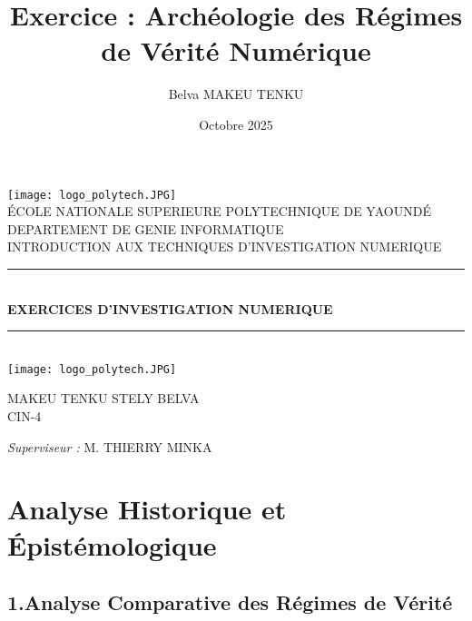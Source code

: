 \documentclass[a4paper,12pt]{report}
\title{Exercice : Archéologie des Régimes de Vérité Numérique}
\author{Belva MAKEU TENKU}
\date{Octobre 2025}
\newcommand{\HRule}{\rule{\linewidth}{0.5mm}}
\begin{document}
	
	\begin{titlepage}
		\begin{sffamily}
			\begin{center}
				\texttt{[image: logo\_polytech.JPG]}~\\[1.5cm]
				\textsc{\LARGE ÉCOLE NATIONALE SUPERIEURE POLYTECHNIQUE DE YAOUNDÉ }\\[2cm]
				\textsc{\LARGE DEPARTEMENT DE GENIE INFORMATIQUE }\\[2cm]
				\textsc{\LARGE INTRODUCTION AUX TECHNIQUES D'INVESTIGATION NUMERIQUE }\\[1.5cm]
				\HRule \\[0.4cm]
				{ \huge \bfseries EXERCICES D'INVESTIGATION NUMERIQUE\\[0.4cm] }
				\HRule \\[2cm]
				\texttt{[image: logo\_polytech.JPG]} \\[2cm]
				\begin{minipage}{0.4\textwidth}
					\begin{flushleft} \large
						MAKEU TENKU STELY BELVA\\
						CIN-4\\
					\end{flushleft}
				\end{minipage}
				\begin{minipage}{0.4\textwidth}
					\begin{flushright} \large
						\emph{Superviseur :} M. \textsc{THIERRY MINKA}\\
					\end{flushright}
				\end{minipage}
				\vfill
			\end{center}
		\end{sffamily}
	\end{titlepage}
	
	\newpage
	
	
	\chapter{Analyse Historique et Épistémologique}
	
	
	\section*{1.Analyse Comparative des Régimes de Vérité}
\end{document}
